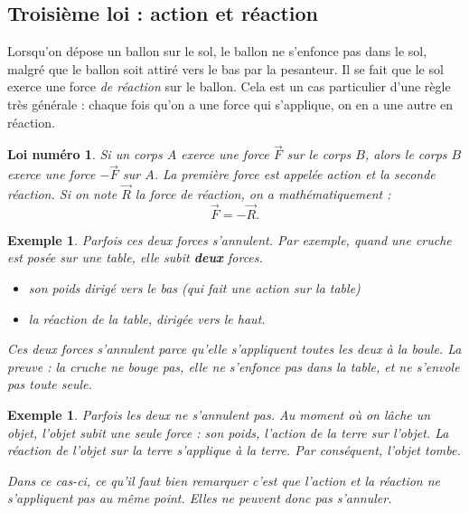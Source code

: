 \documentclass[a4paper,12pt]{book}
\newcounter{numloiphyz}
\theoremstyle{mes_exemples}	\newtheorem{exemple}[numtho]{Exemple}
\theoremstyle{mes_tho}
\newtheorem{loiphyz}[numloiphyz]{Loi numéro}
\begin{document}
\subsection{Troisième loi : action et réaction}

Lorsqu'on dépose un ballon sur le sol, le ballon ne s'enfonce pas dans le sol, malgré que le ballon soit attiré vers le bas par la pesanteur. Il se fait que le sol exerce une force \emph{de réaction} sur le ballon. Cela est un cas particulier d'une règle très générale : chaque fois qu'on a une force qui s'applique, on en a une autre en réaction.

\begin{loiphyz}
Si un corps $A$ exerce une force $\overrightarrow{F}$ sur le corps $B$, alors le corps $B$ exerce une force $-\overrightarrow{F}$ sur $A$. La première force est appelée \emph{action} et la seconde \emph{réaction}. Si on note $\overrightarrow{R}$ la force de réaction, on a mathématiquement :
\begin{equation}   \label{EqActReact}
  \overrightarrow{F}=-\overrightarrow{R}.
\end{equation}

\end{loiphyz}


\begin{exemple}
Parfois ces deux forces s'annulent. Par exemple, quand une cruche est posée sur une table, elle subit {\bf deux} forces.
\begin{itemize}
\item son poids dirigé vers le bas (qui fait une action sur la table)
\item la réaction de la table, dirigée vers le haut.
\end{itemize}
Ces deux forces s'annulent parce qu'elle s'appliquent toutes les deux à la boule. La preuve : la cruche ne bouge pas, elle ne s'enfonce pas dans la table, et ne s'envole pas toute seule.
\end{exemple}

\begin{exemple}
Parfois les deux ne s'annulent pas. Au moment où on lâche un objet, l'objet subit \emph{une seule force} : son poids, l'action de la terre sur l'objet. La réaction de l'objet sur la terre s'applique à la terre. Par conséquent, l'objet tombe.

Dans ce cas-ci, ce qu'il faut bien remarquer c'est que l'action et la réaction ne s'appliquent pas au même point. Elles ne peuvent donc pas s'annuler.
\end{exemple}
\end{document}
